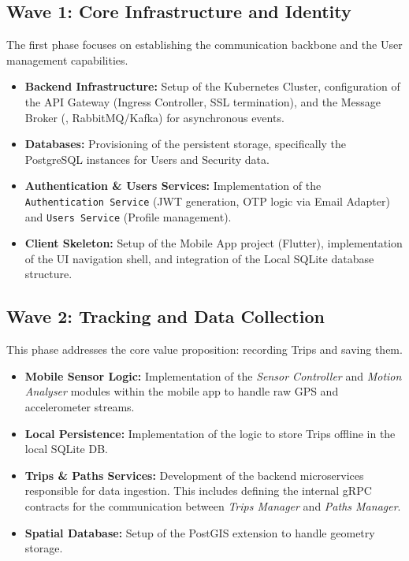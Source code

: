 \subsection*{Wave 1: Core Infrastructure and Identity}
The first phase focuses on establishing the communication backbone and the User management capabilities.
\begin{itemize}
    \item \textbf{Backend Infrastructure:} Setup of the Kubernetes Cluster, configuration of the API Gateway (Ingress Controller, SSL termination), and the Message Broker (\eg, RabbitMQ/Kafka) for asynchronous events.
    \item \textbf{Databases:} Provisioning of the persistent storage, specifically the PostgreSQL instances for Users and Security data.
    \item \textbf{Authentication \& Users Services:} Implementation of the \texttt{Authentication Service} (JWT generation, OTP logic via Email Adapter) and \texttt{Users Service} (Profile management).
    \item \textbf{Client Skeleton:} Setup of the Mobile App project (Flutter), implementation of the UI navigation shell, and integration of the Local SQLite database structure.
\end{itemize}

\subsection*{Wave 2: Tracking and Data Collection}
This phase addresses the core value proposition: recording Trips and saving them.
\begin{itemize}
    \item \textbf{Mobile Sensor Logic:} Implementation of the \emph{Sensor Controller} and \emph{Motion Analyser} modules within the mobile app to handle raw GPS and accelerometer streams.
    \item \textbf{Local Persistence:} Implementation of the logic to store Trips offline in the local SQLite DB.
    \item \textbf{Trips \& Paths Services:} Development of the backend microservices responsible for data ingestion. This includes defining the internal gRPC contracts for the communication between \emph{Trips Manager} and \emph{Paths Manager}.
    \item \textbf{Spatial Database:} Setup of the PostGIS extension to handle geometry storage.
\end{itemize}

